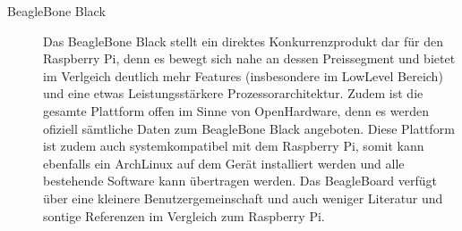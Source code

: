 \begin{description}
	\item[BeagleBone Black] Das BeagleBone Black stellt ein direktes
		Konkurrenzprodukt dar für den Raspberry Pi, denn es bewegt
		sich nahe an dessen Preissegment und bietet im Verlgeich
		deutlich mehr Features (insbesondere im LowLevel Bereich)
		und eine etwas Leistungsstärkere Prozessorarchitektur. Zudem 
		ist die gesamte Plattform offen im Sinne von OpenHardware, 
		denn es werden ofiziell sämtliche Daten zum BeagleBone Black
		angeboten. Diese Plattform ist zudem auch systemkompatibel
		mit dem Raspberry Pi, somit kann ebenfalls ein ArchLinux
		auf dem Gerät installiert werden und alle bestehende 
		Software kann übertragen werden. Das BeagleBoard verfügt
		über eine kleinere Benutzergemeinschaft und auch weniger
		Literatur und sontige Referenzen im Vergleich zum Raspberry
		Pi.
\end{description}
